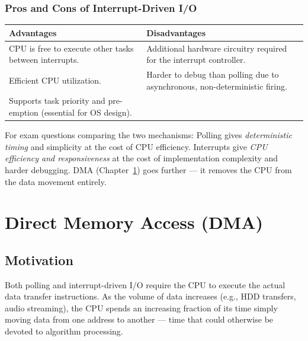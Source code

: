 \documentclass[11pt, a4paper, notitlepage]{report}
\theoremstyle{definition}
\theoremstyle{remark}
\theoremstyle{definition}
\begin{document}
\subsubsection{Pros and Cons of Interrupt-Driven I/O}

\begin{center}
\renewcommand{\arraystretch}{1.3}
\begin{tabular}{p{} p{}}
  \toprule
  \textbf{Advantages} & \textbf{Disadvantages} \\
  \midrule
  CPU is free to execute other tasks between interrupts. &
  Additional hardware circuitry required for the interrupt controller. \\
  Efficient CPU utilization. &
  Harder to debug than polling due to asynchronous, non-deterministic firing. \\
  Supports task priority and pre-emption (essential for OS design). & \\
  \bottomrule
\end{tabular}
\end{center}

\begin{examtip}[title={Exam Tip: Polling vs.\ Interrupt Trade-offs}]
  For exam questions comparing the two mechanisms: Polling gives \emph{deterministic timing} and simplicity at the cost of CPU efficiency. Interrupts give \emph{CPU efficiency and responsiveness} at the cost of implementation complexity and harder debugging. DMA (Chapter~\ref{ch:dma}) goes further — it removes the CPU from the data movement entirely.
\end{examtip}

\section{Direct Memory Access (DMA)}
\label{ch:dma}

\subsection{Motivation}
\label{sec:dma-motivation}

Both polling and interrupt-driven I/O require the CPU to execute the actual data transfer instructions. As the volume of data increases (e.g., HDD transfers, audio streaming), the CPU spends an increasing fraction of its time simply moving data from one address to another — time that could otherwise be devoted to algorithm processing.
\end{document}
